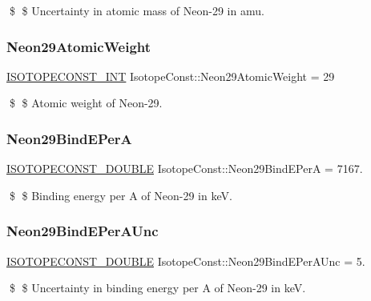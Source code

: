 \$ \$ Uncertainty in atomic mass of Neon-\/29 in amu. \mbox{\label{group___isotope_const-_neon-_ne29_gaef92645ad805a8d07a0bce7e695db257}} 
\subsubsection{\texorpdfstring{Neon29\+Atomic\+Weight}{Neon29AtomicWeight}}
{\footnotesize\ttfamily \mbox{\hyperlink{group___isotope_const-_macros_ga5f18360b3e99483a35c32d789e62621c}{I\+S\+O\+T\+O\+P\+E\+C\+O\+N\+S\+T\+\_\+\+I\+NT}} Isotope\+Const\+::\+Neon29\+Atomic\+Weight = 29}

\$ \$ Atomic weight of Neon-\/29. \mbox{\label{group___isotope_const-_neon-_ne29_gadcd62f0d5af687618903a5fffcee2694}} 
\subsubsection{\texorpdfstring{Neon29\+Bind\+E\+PerA}{Neon29BindEPerA}}
{\footnotesize\ttfamily \mbox{\hyperlink{group___isotope_const-_macros_ga8f45a7272ce02c0b4c65c44636ed719a}{I\+S\+O\+T\+O\+P\+E\+C\+O\+N\+S\+T\+\_\+\+D\+O\+U\+B\+LE}} Isotope\+Const\+::\+Neon29\+Bind\+E\+PerA = 7167.}

\$ \$ Binding energy per A of Neon-\/29 in keV. \mbox{\label{group___isotope_const-_neon-_ne29_gabc79457ca4d84dbacb872f337ac422f5}} 
\subsubsection{\texorpdfstring{Neon29\+Bind\+E\+Per\+A\+Unc}{Neon29BindEPerAUnc}}
{\footnotesize\ttfamily \mbox{\hyperlink{group___isotope_const-_macros_ga8f45a7272ce02c0b4c65c44636ed719a}{I\+S\+O\+T\+O\+P\+E\+C\+O\+N\+S\+T\+\_\+\+D\+O\+U\+B\+LE}} Isotope\+Const\+::\+Neon29\+Bind\+E\+Per\+A\+Unc = 5.}

\$ \$ Uncertainty in binding energy per A of Neon-\/29 in keV. \mbox{\label{group___isotope_const-_neon-_ne29_ga9e9f643d8cff68f321e1e48f6c030fa7}} 
